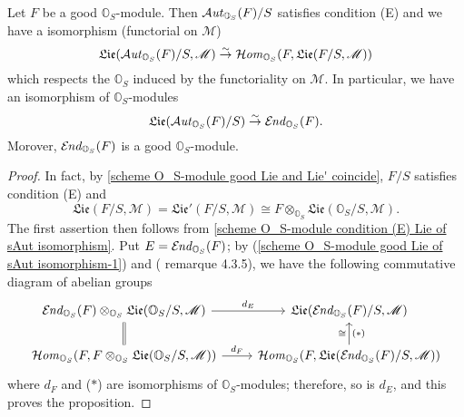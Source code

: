 \begin{proposition}\label{scheme O_S-module good Lie of sAut isomorphism}
Let $F$ be a good $\mathbb{O}_S$-module. Then $\operatorname{\mathcal{A}\hspace*{-0.2pt}\textit{ut}\hspace{0.5pt}}_{\mathbb{O}_S}(F)/S$ satisfies condition (E) and we have a isomorphism (functorial on $\mathscr{M}$)
\[\mathfrak{Lie}(\operatorname{\mathcal{A}\hspace*{-0.2pt}\textit{ut}\hspace{0.5pt}}_{\mathbb{O}_S}(F)/S,\mathscr{M})\stackrel{\sim}{\to} \operatorname{\mathcal{H}\hspace*{-0.4pt}\textit{om}\hspace{0.5pt}}_{\mathbb{O}_S}(F,\mathfrak{Lie}(F/S,\mathscr{M}))\]
which respects the $\mathbb{O}_S$ induced by the functoriality on $\mathscr{M}$. In particular, we have an isomorphism of $\mathbb{O}_S$-modules
\[\mathfrak{Lie}(\operatorname{\mathcal{A}\hspace*{-0.2pt}\textit{ut}\hspace{0.5pt}}_{\mathbb{O}_S}(F)/S)\stackrel{\sim}{\to} \operatorname{\mathcal{E}\hspace*{-1pt}\textit{nd}\hspace{0.5pt}}_{\mathbb{O}_S}(F).\]
Morover, $\operatorname{\mathcal{E}\hspace*{-1pt}\textit{nd}\hspace{0.5pt}}_{\mathbb{O}_S}(F)$ is a good $\mathbb{O}_S$-module.
\end{proposition}
\begin{proof}
In fact, by \cref{scheme O_S-module good Lie and Lie' coincide}, $F/S$ satisfies condition (E) and
\begin{equation}\label{scheme O_S-module good Lie of sAut isomorphism-1}
\mathfrak{Lie}(F/S,\mathscr{M})=\mathfrak{Lie}'(F/S,\mathscr{M})\cong F\otimes_{\mathbb{O}_S}\mathfrak{Lie}(\mathbb{O}_S/S,\mathscr{M}).
\end{equation}
The first assertion then follows from \cref{scheme O_S-module condition (E) Lie of sAut isomorphism}. Put $E=\operatorname{\mathcal{E}\hspace*{-1pt}\textit{nd}\hspace{0.5pt}}_{\mathbb{O}_S}(F)$; by (\ref{scheme O_S-module good Lie of sAut isomorphism-1}) and (\cite{SGA3-1} remarque 4.3.5), we have the following commutative diagram of abelian groups
\[\begin{tikzcd}
\sEnd_{\mathbb{O}_S}(F)\otimes_{\mathbb{O}_S}\mathfrak{Lie}(\mathbb{O}_S/S,\mathscr{M})\ar[d,equal]\ar[r,"d_E"]&\mathfrak{Lie}(\sEnd_{\mathbb{O}_S}(F)/S,\mathscr{M})\\
\sHom_{\mathbb{O}_S}(F,F\otimes_{\mathbb{O}_S}\mathfrak{Lie}(\mathbb{O}_S/S,\mathscr{M}))\ar[r,"d_F"]&\sHom_{\mathbb{O}_S}(F,\mathfrak{Lie}(\sEnd_{\mathbb{O}_S}(F)/S,\mathscr{M}))\ar[u,"\cong","(*)"']
\end{tikzcd}\]
where $d_F$ and ($*$) are isomorphisms of $\mathbb{O}_S$-modules; therefore, so is $d_E$, and this proves the proposition.
\end{proof}

